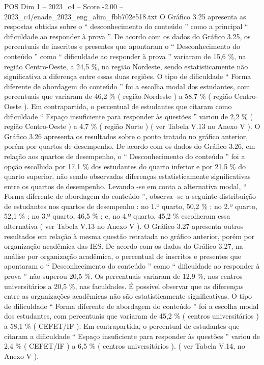 \begin{textsample}{POS Dim 1 – 2023\_c4 – Score -2.00 – 2023\_c4/enade\_2023\_eng\_alim\_fbb702e518.txt}
O Gráfico 3.25 apresenta as respostas obtidas sobre o “ desconhecimento do conteúdo ” como a principal “ dificuldade ao responder à prova ”.
De acordo com os dados do Gráfico 3.25, os percentuais de inscritos e presentes que apontaram o “ Desconhecimento do conteúdo ” como “ dificuldade ao responder à prova ” variaram de 15,6 \%, na região Centro-Oeste, a 24,5 \%, na região Nordeste, sendo estatisticamente não significativa a diferença entre essas duas regiões.
O tipo de dificuldade “ Forma diferente de abordagem do conteúdo ” foi a escolha modal dos estudantes, com percentuais que variaram de 46,2 \% ( região Nordeste ) a 58,7 \% ( região Centro-Oeste ).
Em contrapartida, o percentual de estudantes que citaram como dificuldade “ Espaço insuficiente para responder às questões ” variou de 2,2 \% ( região Centro-Oeste ) a 4,7 \% ( região Norte ) ( ver Tabela V.13 no Anexo V ).
O Gráfico 3.26 apresenta os resultados sobre o ponto tratado no gráfico anterior, porém por quartos de desempenho.
De acordo com os dados do Gráfico 3.26, em relação aos quartos de desempenho, o “ Desconhecimento do conteúdo ” foi a opção escolhida por 17,1 \% dos estudantes do quarto inferior e por 21,5 \% do quarto superior, não sendo observadas diferenças estatisticamente significativas entre os quartos de desempenho.
Levando -se em conta a alternativa modal, “ Forma diferente de abordagem do conteúdo ”, observa -se a seguinte distribuição de estudantes nos quartos de desempenho : no 1.º quarto, 50,2 \% ; no 2.º quarto, 52,1 \% ; no 3.º quarto, 46,5 \% ; e, no 4.º quarto, 45,2 \% escolheram essa alternativa ( ver Tabela V.13 no Anexo V ).
O Gráfico 3.27 apresenta outros resultados em relação à mesma questão retratada no gráfico anterior, porém por organização acadêmica das IES.
De acordo com os dados do Gráfico 3.27, na análise por organização acadêmica, o percentual de inscritos e presentes que apontaram o “ Desconhecimento do conteúdo ” como “ dificuldade ao responder à prova ” não superou 20,5 \%.
Os percentuais variaram de 12,9 \%, nos centros universitários a 20,5 \%, nas faculdades.
É possível observar que as diferenças entre as organizações acadêmicas não são estatisticamente significativas.
O tipo de dificuldade “ Forma diferente de abordagem do conteúdo ” foi a escolha modal dos estudantes, com percentuais que variaram de 45,2 \% ( centros universitários ) a 58,1 \% ( CEFET/IF ).
Em contrapartida, o percentual de estudantes que citaram a dificuldade “ Espaço insuficiente para responder às questões ” variou de 2,4 \% ( CEFET/IF ) a 6,5 \% ( centros universitários ). ( ver Tabela V.14, no Anexo V ).

\end{textsample}
